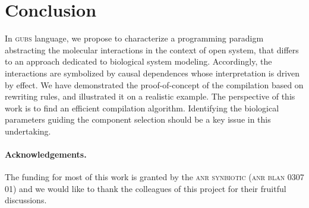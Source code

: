 \documentclass{eptcs}
\newcounter{ti}
\begin{document}
\section{Conclusion}
\label{sec:conclusion}
In \textsc{gubs} language, we propose to characterize a programming paradigm abstracting the molecular interactions in the context of open system, that differs to an approach dedicated to biological system modeling. Accordingly, the interactions are symbolized by causal dependences whose interpretation is driven by effect. We have demonstrated the proof-of-concept of the compilation based on rewriting rules, and illustrated it on a realistic example. The perspective of this work is to find an efficient compilation algorithm. 
Identifying the biological parameters guiding the component selection should be a key issue in this undertaking.

\paragraph{Acknowledgements.}
The funding for most of this work is granted by the \textsc{anr synbiotic} (\textsc{anr blan} 0307 01) and we would like to thank the colleagues of this project for their fruitful discussions. 

	

\vfill 
\end{document}
